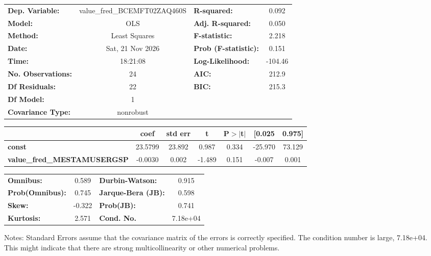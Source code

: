 \begin{center}
\begin{tabular}{lclc}
\toprule
\textbf{Dep. Variable:}             & value\_fred\_BCEMFT02ZAQ460S & \textbf{  R-squared:         } &     0.092   \\
\textbf{Model:}                     &             OLS              & \textbf{  Adj. R-squared:    } &     0.050   \\
\textbf{Method:}                    &        Least Squares         & \textbf{  F-statistic:       } &     2.218   \\
\textbf{Date:}                      &       Sat, 21 Nov 2026       & \textbf{  Prob (F-statistic):} &    0.151    \\
\textbf{Time:}                      &           18:21:08           & \textbf{  Log-Likelihood:    } &   -104.46   \\
\textbf{No. Observations:}          &                24            & \textbf{  AIC:               } &     212.9   \\
\textbf{Df Residuals:}              &                22            & \textbf{  BIC:               } &     215.3   \\
\textbf{Df Model:}                  &                 1            & \textbf{                     } &             \\
\textbf{Covariance Type:}           &          nonrobust           & \textbf{                     } &             \\
\bottomrule
\end{tabular}
\begin{tabular}{lcccccc}
                                    & \textbf{coef} & \textbf{std err} & \textbf{t} & \textbf{P$> |$t$|$} & \textbf{[0.025} & \textbf{0.975]}  \\
\midrule
\textbf{const}                      &      23.5799  &       23.892     &     0.987  &         0.334        &      -25.970    &       73.129     \\
\textbf{value\_fred\_MESTAMUSERGSP} &      -0.0030  &        0.002     &    -1.489  &         0.151        &       -0.007    &        0.001     \\
\bottomrule
\end{tabular}
\begin{tabular}{lclc}
\textbf{Omnibus:}       &  0.589 & \textbf{  Durbin-Watson:     } &    0.915  \\
\textbf{Prob(Omnibus):} &  0.745 & \textbf{  Jarque-Bera (JB):  } &    0.598  \\
\textbf{Skew:}          & -0.322 & \textbf{  Prob(JB):          } &    0.741  \\
\textbf{Kurtosis:}      &  2.571 & \textbf{  Cond. No.          } & 7.18e+04  \\
\bottomrule
\end{tabular}
\end{center}

Notes: \newline
 [1] Standard Errors assume that the covariance matrix of the errors is correctly specified. \newline
 [2] The condition number is large, 7.18e+04. This might indicate that there are \newline
 strong multicollinearity or other numerical problems.